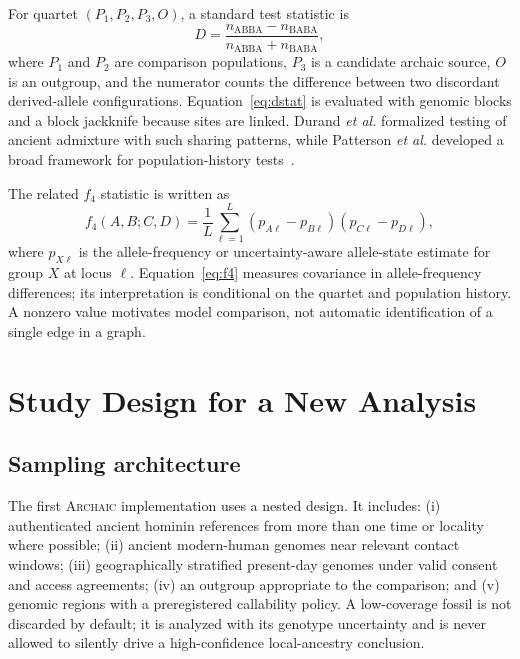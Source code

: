 \documentclass[conference]{IEEEtran}
\newcommand{\archaic}{\textsc{Archaic}}
\begin{document}
For quartet $(P_1,P_2,P_3,O)$, a standard test statistic is
\begin{equation}
\label{eq:dstat}
D=\frac{n_{\mathrm{ABBA}}-n_{\mathrm{BABA}}}{n_{\mathrm{ABBA}}+n_{\mathrm{BABA}}},
\end{equation}
where $P_1$ and $P_2$ are comparison populations, $P_3$ is a candidate archaic source, $O$ is an outgroup, and the numerator counts the difference between two discordant derived-allele configurations. Equation~\eqref{eq:dstat} is evaluated with genomic blocks and a block jackknife because sites are linked. Durand \emph{et al.} formalized testing of ancient admixture with such sharing patterns, while Patterson \emph{et al.} developed a broad framework for population-history tests~\cite{durand2011,patterson2012}.

The related $f_4$ statistic is written as
\begin{equation}
\label{eq:f4}
f_4(A,B;C,D)=\frac{1}{L}\sum_{\ell=1}^{L}(p_{A\ell}-p_{B\ell})(p_{C\ell}-p_{D\ell}),
\end{equation}
where $p_{X\ell}$ is the allele-frequency or uncertainty-aware allele-state estimate for group $X$ at locus $\ell$. Equation~\eqref{eq:f4} measures covariance in allele-frequency differences; its interpretation is conditional on the quartet and population history. A nonzero value motivates model comparison, not automatic identification of a single edge in a graph.

\section{Study Design for a New Analysis}

\subsection{Sampling architecture}

The first \archaic{} implementation uses a nested design. It includes: (i) authenticated ancient hominin references from more than one time or locality where possible; (ii) ancient modern-human genomes near relevant contact windows; (iii) geographically stratified present-day genomes under valid consent and access agreements; (iv) an outgroup appropriate to the comparison; and (v) genomic regions with a preregistered callability policy. A low-coverage fossil is not discarded by default; it is analyzed with its genotype uncertainty and is never allowed to silently drive a high-confidence local-ancestry conclusion.
\end{document}
